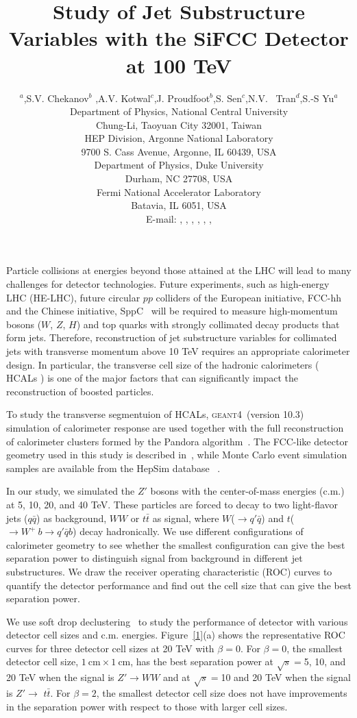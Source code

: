 \documentclass[a4paper]{PoS}
\title{Study of Jet Substructure Variables with the SiFCC Detector at 100 TeV}
\author{\speaker{C.-H Yeh}$^a$,S.V. Chekanov$^b$ ,A.V. Kotwal$^{c}$,J. Proudfoot$^{b}$,S. Sen$^{c}$,N.V. ~Tran$^{d}$,S.-S Yu$^{a}$\\     
     \llap{$^a$}Department of Physics, National Central University\\
     Chung-Li, Taoyuan City 32001, Taiwan\\
     \llap{$^b$}HEP Division, Argonne National Laboratory\\
     9700 S. Cass Avenue, Argonne, IL 60439, USA\\
     \llap{$^c$}Department of Physics, Duke University\\
     Durham, NC 27708, USA\\
     \llap{$^d$}Fermi National Accelerator Laboratory\\
     Batavia, IL 6051, USA\\
     E-mail:  \email{a9510130375@gmail.com},
     \email{chekanov@anl.gov},
     \email{kotwal@phy.duke.edu},
     \email{sourav.sen@duke.edu},
     \email{ntran@fnal.gov},
     \email{proudfoot@anl.gov},
     \email{syu@phy.ncu.edu.tw}}
\newcommand{\GEANTfour} {\textsc{geant4}}
\begin{document}
Particle collisions at energies  beyond those attained at the LHC will lead to many 
challenges for detector technologies.
Future experiments, such as high-energy LHC (HE-LHC),
future circular $pp$ colliders of the European initiative, FCC-hh~\cite{Benedikt:2206376} and the Chinese initiative, SppC~\cite{Tang:2015qga} will be required to measure high-momentum bosons ($W$, $Z$, $H$) and top quarks with strongly
collimated decay products that form jets.  
Therefore, reconstruction of jet substructure  variables for collimated jets with transverse 
momentum above 10 TeV
requires an appropriate calorimeter design.  In particular, the transverse cell size of the hadronic 
calorimeters ( HCALs ) is one of the major factors that can significantly impact 
the reconstruction of boosted particles.

To study the transverse segmentuion of HCALs,
\GEANTfour\ (version 10.3) ~\cite{Allison:2016} simulation of calorimeter response are used together
with the full reconstruction of calorimeter clusters formed by the Pandora algorithm~\cite{Marshall:2013,Charles:2009ta}.
The FCC-like detector geometry used in this study is described in~\cite{Chekanov:2016ppq},
while Monte Carlo event simulation samples are available from the
HepSim database ~\cite{Chekanov:2014fga}.

In our study, we simulated the $Z'$ bosons with the center-of-mass energies (c.m.) at 5, 10, 20, and 40 TeV. These particles are forced to decay to two light-flavor jets ($q\bar{q}$) as background, $W W$ or $t\bar{t}$ as signal, where $W$($\rightarrow$$q'\bar{q}$) and $t$($ \rightarrow  W^+\>b \rightarrow q'\bar{q} b$) decay hadronically. We use different configurations of calorimeter geometry to see whether the smallest configuration can give the best separation power to distinguish signal from background in different jet substructures. We draw the receiver operating characteristic (ROC) curves to quantify the detector performance and find out the cell size that can give the best separation power.

We use soft drop declustering~\cite{Larkoski:2014wba} to study the performance of detector with various detector cell sizes and c.m. energies. Figure~\ref{1}(a) shows the representative ROC curves for three detector cell sizes at 20 TeV with $\beta=0$. For $\beta=0$, the smallest detector cell size, $1~\mathrm{cm}\times1~\mathrm{cm}$, has the best separation power at $\sqrt{s}=$5, 10, and 20 TeV when the signal is $Z' \rightarrow WW$ and at $\sqrt{s}=$10 and 20 TeV when the signal is $Z' \rightarrow$ $t\bar{t}$. For $\beta=2$, the smallest detector cell size does not have improvements in the separation power with respect to those with larger cell sizes.
\end{document}
